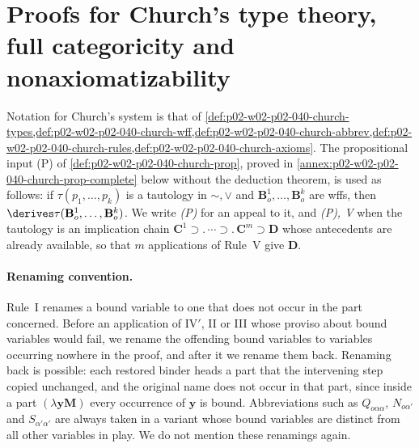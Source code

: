 \section{Proofs for Church's type theory, full categoricity and nonaxiomatizability}
\label{sec:annex-p02-w02-p02-040}

Notation for Church's system is that of
\cref{def:p02-w02-p02-040-church-types,def:p02-w02-p02-040-church-wff,def:p02-w02-p02-040-church-abbrev,def:p02-w02-p02-040-church-rules,def:p02-w02-p02-040-church-axioms}.
The propositional input (P) of \cref{def:p02-w02-p02-040-church-prop},
proved in \cref{annex:p02-w02-p02-040-church-prop-complete} below without
the deduction theorem, is used as follows: if \(\tau(p_1,\ldots,p_k)\) is a tautology in \(\sim,\vee\) and
\(\mathbf B^1_o,\ldots,\mathbf B^k_o\) are wffs, then
\(\derives\tau(\mathbf B^1_o,\ldots,\mathbf B^k_o)\).  We write
\emph{(P)} for an appeal to it, and \emph{(P), V} when the tautology is an
implication chain \(\mathbf C^1\supset.\,\cdots\supset.\,\mathbf C^m\supset\mathbf D\)
whose antecedents are already available, so that \(m\) applications of
Rule~V give \(\mathbf D\).

\paragraph{Renaming convention.}  Rule~I renames a bound variable to one that
does not occur in the part concerned.  Before an application of IV\('\),
II or III whose proviso about bound variables would fail, we rename the
offending bound variables to variables occurring nowhere in the proof, and
after it we rename them back.  Renaming back is possible: each restored
binder heads a part that the intervening step copied unchanged, and the
original name does not occur in that part, since inside a part
\((\lambda\mathbf y\mathbf M)\) every occurrence of \(\mathbf y\) is bound.
Abbreviations such as \(Q_{o\alpha\alpha}\), \(N_{o\alpha'}\) and
\(S_{\alpha'\alpha'}\) are always taken in a variant whose bound variables
are distinct from all other variables in play.  We do not mention these
renamings again.


